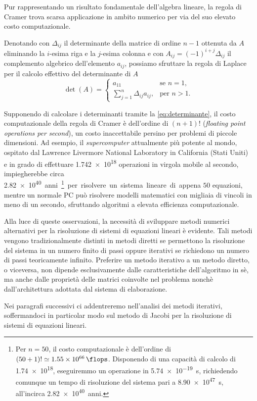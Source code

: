 Pur rappresentando un risultato fondamentale dell'algebra lineare, la regola di Cramer trova scarsa applicazione in ambito numerico per via del suo elevato
costo computazionale.

Denotando con $\Delta_{ij}$ il determinante della matrice di ordine $n-1$ ottenuta da $A$ eliminando la $i$-esima riga e la $j$-esima colonna e con
$A_{ij} = (-1)^{i+j}\Delta_{ij}$ il complemento algebrico dell'elemento $a_{ij}$, possiamo sfruttare la regola di Laplace per il calcolo effettivo del
determinante di $A$
\begin{equation}
    \label{eq:determinante}
    \det(A) =
    \begin{cases}
        a_{11}                                   & \text{se } n=1,  \\[1em]
        \displaystyle\sum_{j=1}^{n} \Delta_{ij}a_{ij}, & \text{per } n>1.
    \end{cases}
\end{equation}

Supponendo di calcolare i determinanti tramite la \eqref{eq:determinante}, il costo computazionale della regola di Cramer \`e
dell'ordine di $(n+1)!$ \si{\flops} (\textit{floating point operations per second}), un costo inaccettabile persino per problemi di
piccole dimensioni.\newline
Ad esempio, il \textit{supercomputer} attualmente pi\`u potente al mondo, ospitato dal
Lawrence Livermore National Laboratory in California (Stati Uniti)\,\cite{Thomas2024} e in grado di effettuare \num{1.742e18} operazioni in virgola mobile al 
secondo, impiegherebbe circa \SI{2.82e40} anni\footnote{Per $n=50$, il costo computazionale \`e dell'ordine di
    $(50+1)! \simeq \SI{1.55e66}{\flops}$.\newline
    Disponendo di una capacit\`a di calcolo di \SI{1.74e18}{\flops}, eseguiremmo un operazione in \SI{5.74e-19}{s}, richiedendo
    comunque un tempo di risoluzione del sistema pari a \SI{8.90e47}{s}, all'incirca \SI{2.82e40}{anni}.}per risolvere un sistema
lineare di appena $50$ equazioni, mentre un normale PC pu\`o risolvere modelli matematici con migliaia
di vincoli in meno di un secondo, sfruttando algoritmi a elevata efficienza computazionale.

Alla luce di queste osservazioni, la necessit\`a di sviluppare metodi numerici alternativi per la risoluzione di sistemi di
equazioni lineari \`e evidente.\newline
Tali metodi vengono tradizionalmente distinti in metodi
diretti se permettono la risoluzione del sistema in un numero finito di passi oppure iterativi se richiedono un numero di passi
teoricamente infinito.\newline
Preferire un metodo iterativo a un metodo diretto, o viceversa, non dipende esclusivamente dalle caratteristiche dell'algoritmo in s\`e, ma anche dalle propriet\`a delle matrici coinvolte nel problema nonch\`e dall'architettura adottata dal sistema di elaborazione.

Nei paragrafi successivi ci addentreremo nell'analisi dei metodi iterativi, soffermandoci in particolar modo sul metodo di Jacobi per la risoluzione di sistemi di equazioni lineari.

